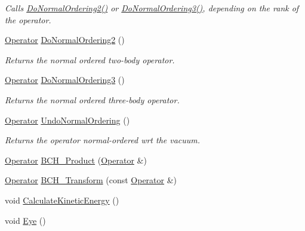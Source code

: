 \begin{DoxyCompactItemize}
\begin{DoxyCompactList}\small\item\em Calls \hyperlink{classOperator_a652d989590422a2b26e662625b07254e}{Do\-Normal\-Ordering2()} or \hyperlink{classOperator_a7fd029569796107c87ff17c5a7912480}{Do\-Normal\-Ordering3()}, depending on the rank of the operator. \end{DoxyCompactList}\item 
\hyperlink{classOperator}{Operator} \hyperlink{classOperator_a652d989590422a2b26e662625b07254e}{Do\-Normal\-Ordering2} ()
\begin{DoxyCompactList}\small\item\em Returns the normal ordered two-\/body operator. \end{DoxyCompactList}\item 
\hyperlink{classOperator}{Operator} \hyperlink{classOperator_a7fd029569796107c87ff17c5a7912480}{Do\-Normal\-Ordering3} ()
\begin{DoxyCompactList}\small\item\em Returns the normal ordered three-\/body operator. \end{DoxyCompactList}\item 
\hypertarget{classOperator_a1932dcab2be6bb889320254cc81dd5f4}{\hyperlink{classOperator}{Operator} \hyperlink{classOperator_a1932dcab2be6bb889320254cc81dd5f4}{Undo\-Normal\-Ordering} ()}\label{classOperator_a1932dcab2be6bb889320254cc81dd5f4}

\begin{DoxyCompactList}\small\item\em Returns the operator normal-\/ordered wrt the vacuum. \end{DoxyCompactList}\item 
\hyperlink{classOperator}{Operator} \hyperlink{classOperator_a6a91cd02db723ee28b7532e6af029033}{B\-C\-H\-\_\-\-Product} (\hyperlink{classOperator}{Operator} \&)
\item 
\hyperlink{classOperator}{Operator} \hyperlink{classOperator_a9a2d6b13d851f2655f3ef88033a24c5b}{B\-C\-H\-\_\-\-Transform} (const \hyperlink{classOperator}{Operator} \&)
\item 
void \hyperlink{classOperator_a701c64f8be794e89fd28a643b56d534a}{Calculate\-Kinetic\-Energy} ()
\item 
\hypertarget{classOperator_a03a378f0da2fe71d8160bd3262891457}{void \hyperlink{classOperator_a03a378f0da2fe71d8160bd3262891457}{Eye} ()}\label{classOperator_a03a378f0da2fe71d8160bd3262891457}


\end{DoxyCompactItemize}
